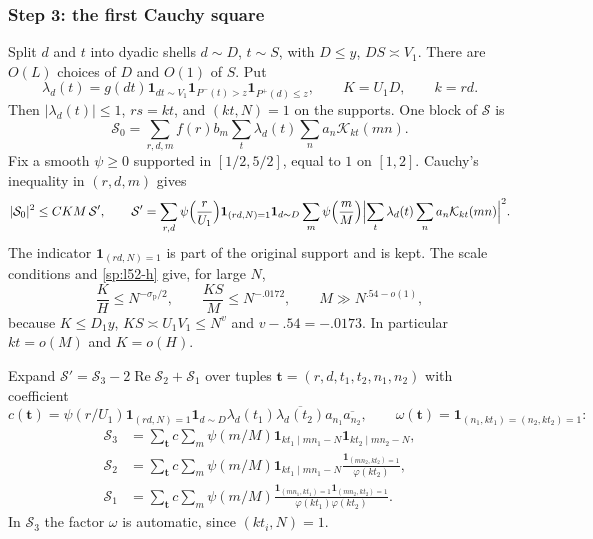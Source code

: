 \subsubsection*{Step 3: the first Cauchy square}
Split $d$ and $t$ into dyadic shells $d\sim D$, $t\sim S$, with $D\le y$,
$DS\asymp V_1$. There are $O(L)$ choices of $D$ and $O(1)$ of $S$. Put
\[
 \lambda_d(t)=g(dt)\mathbf1_{dt\sim V_1}\mathbf1_{P^-(t)>z}\mathbf1_{P^+(d)\le z},
 \qquad K=U_1D,\qquad k=rd .
\]
Then $|\lambda_d(t)|\le1$, $rs=kt$, and $(kt,N)=1$ on the supports. One
block of $\mathcal S$ is
\[
 \mathcal S_0=\sum_{r,d,m}f(r)b_m\sum_t\lambda_d(t)\sum_na_n\mathcal K_{kt}(mn).
\]
Fix a smooth $\psi\ge0$ supported in $[1/2,5/2]$, equal to $1$ on $[1,2]$.
Cauchy's inequality in $(r,d,m)$ gives
\begin{equation}\label{sp:l52-cs1}
 |\mathcal S_0|^2\le CKM\,\mathcal S',\qquad
 \mathcal S'=\sum_{r,d}\psi\Bigl(\frac r{U_1}\Bigr)\mathbf1_{(rd,N)=1}\mathbf1_{d\sim D}
 \sum_m\psi\Bigl(\frac mM\Bigr)
 \Bigl|\sum_t\lambda_d(t)\sum_na_n\mathcal K_{kt}(mn)\Bigr|^2 .
\end{equation}
The indicator $\mathbf1_{(rd,N)=1}$ is part of the original support and
is kept. The scale conditions and \eqref{sp:l52-h} give, for large $N$,
\begin{equation}\label{sp:l52-scales}
 \frac KH\le N^{-\sigma_{\mathrm p}/2},\qquad
 \frac{KS}M\le N^{-.0172},\qquad M\gg N^{.54-o(1)},
\end{equation}
because $K\le D_1y$, $KS\asymp U_1V_1\le N^v$ and $v-.54=-.0173$. In
particular $kt=o(M)$ and $K=o(H)$.

Expand $\mathcal S'=\mathcal S_3-2\operatorname{Re}\mathcal S_2+\mathcal S_1$
over tuples $\mathbf t=(r,d,t_1,t_2,n_1,n_2)$ with coefficient
\[
 c(\mathbf t)=\psi(r/U_1)\mathbf1_{(rd,N)=1}\mathbf1_{d\sim D}
 \lambda_d(t_1)\overline{\lambda_d(t_2)}a_{n_1}\overline{a_{n_2}},\qquad
 \omega(\mathbf t)=\mathbf1_{(n_1,kt_1)=(n_2,kt_2)=1}:
\]
\[
\begin{aligned}
 \mathcal S_3&=\sum_{\mathbf t}c\sum_m\psi(m/M)\mathbf1_{kt_1\mid mn_1-N}\mathbf1_{kt_2\mid mn_2-N},\\
 \mathcal S_2&=\sum_{\mathbf t}c\sum_m\psi(m/M)\mathbf1_{kt_1\mid mn_1-N}
   \frac{\mathbf1_{(mn_2,kt_2)=1}}{\varphi(kt_2)},\\
 \mathcal S_1&=\sum_{\mathbf t}c\sum_m\psi(m/M)
   \frac{\mathbf1_{(mn_1,kt_1)=1}\mathbf1_{(mn_2,kt_2)=1}}{\varphi(kt_1)\varphi(kt_2)} .
\end{aligned}
\]
In $\mathcal S_3$ the factor $\omega$ is automatic, since $(kt_i,N)=1$.

